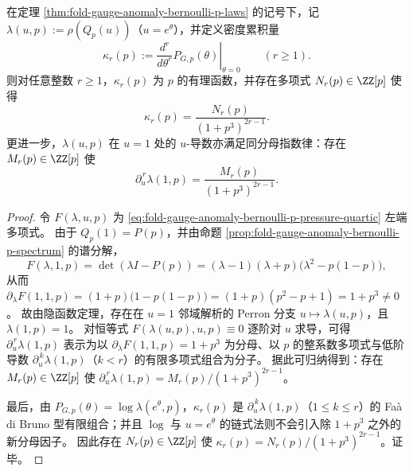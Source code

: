 

\begin{proposition}[全阶密度累积量的有理性与分母指数律]\label{prop:fold-gauge-anomaly-bernoulli-p-cumulant-denominator-law}
在定理 \ref{thm:fold-gauge-anomaly-bernoulli-p-laws} 的记号下，记 \(\lambda(u,p):=\rho(Q_p(u))\)（\(u=e^\theta\)），并定义密度累积量
\[
\kappa_r(p):=\left.\frac{d^r}{d\theta^r}P_{G,p}(\theta)\right|_{\theta=0}\qquad(r\ge 1).
\]
则对任意整数 \(r\ge 1\)，\(\kappa_r(p)\) 为 \(p\) 的有理函数，并存在多项式 \(N_r(p)\in\ZZ[p]\) 使得
\[
\boxed{\;\kappa_r(p)=\frac{N_r(p)}{(1+p^3)^{2r-1}}.\;}
\]
更进一步，\(\lambda(u,p)\) 在 \(u=1\) 处的 \(u\)-导数亦满足同分母指数律：存在 \(M_r(p)\in\ZZ[p]\) 使
\[
\boxed{\;\partial_u^{\,r}\lambda(1,p)=\frac{M_r(p)}{(1+p^3)^{2r-1}}.\;}
\]
\end{proposition}
\begin{proof}
令 \(F(\lambda,u,p)\) 为 \eqref{eq:fold-gauge-anomaly-bernoulli-p-pressure-quartic} 左端多项式。
由于 \(Q_p(1)=P(p)\)，并由命题 \ref{prop:fold-gauge-anomaly-bernoulli-p-spectrum} 的谱分解，
\[
F(\lambda,1,p)=\det(\lambda I-P(p))=(\lambda-1)(\lambda+p)\bigl(\lambda^2-p(1-p)\bigr),
\]
从而
\(
\partial_\lambda F(1,1,p)=(1+p)\bigl(1-p(1-p)\bigr)=(1+p)(p^2-p+1)=1+p^3\neq 0
\)。
故由隐函数定理，存在在 \(u=1\) 邻域解析的 Perron 分支 \(u\mapsto \lambda(u,p)\)，且 \(\lambda(1,p)=1\)。
对恒等式 \(F(\lambda(u,p),u,p)\equiv 0\) 逐阶对 \(u\) 求导，可得 \(\partial_u^{\,r}\lambda(1,p)\) 表示为以 \(\partial_\lambda F(1,1,p)=1+p^3\) 为分母、以 \(p\) 的整系数多项式与低阶导数 \(\partial_u^{\,k}\lambda(1,p)\)（\(k<r\)）的有限多项式组合为分子。
据此可归纳得到：存在 \(M_r(p)\in\ZZ[p]\) 使 \(\partial_u^{\,r}\lambda(1,p)=M_r(p)/(1+p^3)^{2r-1}\)。
\par
最后，由 \(P_{G,p}(\theta)=\log\lambda(e^\theta,p)\)，\(\kappa_r(p)\) 是 \(\partial_u^{\,k}\lambda(1,p)\)（\(1\le k\le r\)）的 Fa\`a di Bruno 型有限组合；并且 \(\log\) 与 \(u=e^\theta\) 的链式法则不会引入除 \(1+p^3\) 之外的新分母因子。
因此存在 \(N_r(p)\in\ZZ[p]\) 使 \(\kappa_r(p)=N_r(p)/(1+p^3)^{2r-1}\)。证毕。
\end{proof}
